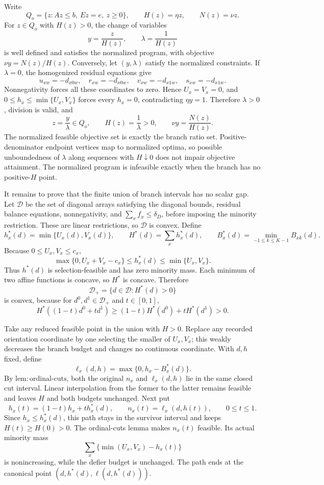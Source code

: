 Write
\[
 Q_o=\{z:Az\leq b,\ Ez=e,\ z\geq0\},
 \qquad H(z)=\eta z,
 \qquad N(z)=\nu z.
\]
For \(z\in Q_o\) with \(H(z)>0\), the change of variables
\[
 y=\frac{z}{H(z)},
 \qquad \lambda=\frac{1}{H(z)}
\]
is well defined and satisfies the normalized program, with objective \(\nu y=N(z)/H(z)\). Conversely, let \((y,\lambda)\) satisfy the normalized constraints. If \(\lambda=0\), the homogenized residual equations give
\[
 u_{xw}=-d_{x0w},\quad r_{xw}=-d_{x0w},\quad
 v_{xw}=-d_{x1w},\quad s_{xw}=-d_{x1w}.
\]
Nonnegativity forces all these coordinates to zero. Hence \(U_x=V_x=0\), and \(0\leq h_x\leq\min\{U_x,V_x\}\) forces every \(h_x=0\), contradicting \(\eta y=1\). Therefore \(\lambda>0\), division is valid, and
\[
 z=\frac{y}{\lambda}\in Q_o,
 \qquad H(z)=\frac1\lambda>0,
 \qquad \nu y=\frac{N(z)}{H(z)}.
\]
The normalized feasible objective set is exactly the branch ratio set. Positive-denominator endpoint vertices map to normalized optima, so possible unboundedness of \(\lambda\) along sequences with \(H\downarrow0\) does not impair objective attainment. The normalized program is infeasible exactly when the branch has no positive-\(H\) point.

It remains to prove that the finite union of branch intervals has no scalar gap. Let \(\mathcal D\) be the set of diagonal arrays satisfying the diagonal bounds, residual balance equations, nonnegativity, and \(\sum_xf_x\leq\delta_D\), before imposing the minority restriction. These are linear restrictions, so \(\mathcal D\) is convex. Define
\[
 h_x^*(d)=\min\{U_x(d),V_x(d)\},
 \qquad H^*(d)=\sum_xh_x^*(d),
 \qquad B_x^*(d)=\min_{-1\leq k\leq K-1}B_{xk}(d).
\]
Because \(0\leq U_x,V_x\leq c_x\),
\[
 \max\{0,U_x+V_x-c_x\}\leq h_x^*(d)
 \leq\min\{U_x,V_x\}.
\]
Thus \(h^*(d)\) is selection-feasible and has zero minority mass. Each minimum of two affine functions is concave, so \(H^*\) is concave. Therefore
\[
 \mathcal D_+=\{d\in\mathcal D:H^*(d)>0\}
\]
is convex, because for \(d^0,d^1\in\mathcal D_+\) and \(t\in[0,1]\),
\[
 H^*((1-t)d^0+td^1)
 \geq(1-t)H^*(d^0)+tH^*(d^1)>0.
\]

Take any reduced feasible point in the union with \(H>0\). Replace any recorded orientation coordinate by one selecting the smaller of \(U_x,V_x\); this weakly decreases the branch budget and changes no continuous coordinate. With \(d,h\) fixed, define
\[
 \ell_x(d,h)=\max\{0,h_x-B_x^*(d)\}.
\]
By \(\mathrm{lem:ordinal\text{-}cuts}\), both the original \(n_x\) and \(\ell_x(d,h)\) lie in the same closed cut interval. Linear interpolation from the former to the latter remains feasible and leaves \(H\) and both budgets unchanged. Next put
\[
 h_x(t)=(1-t)h_x+t h_x^*(d),
 \qquad n_x(t)=\ell_x(d,h(t)),
 \qquad 0\leq t\leq1.
\]
Since \(h_x\leq h_x^*(d)\), this path stays in the survivor interval and keeps \(H(t)\geq H(0)>0\). The ordinal-cuts lemma makes \(n_x(t)\) feasible. Its actual minority mass
\[
 \sum_x\{\min(U_x,V_x)-h_x(t)\}
\]
is nonincreasing, while the defier budget is unchanged. The path ends at the canonical point \((d,h^*(d),\ell(d,h^*(d)))\).

